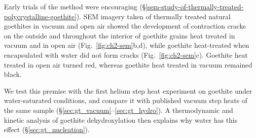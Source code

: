 Early trials of the method were encouraging (\S\ref{sem-study-of-thermally-treated-polycrystalline-goethite}).
SEM imagery taken of thermally treated natural goethites in vacuum and
open air showed the development of contraction cracks on the outside and
throughout the interior of goethite grains heat treated in vacuum and in
open air (Fig.~\ref{fig:ch2-sem}b,d), while goethite heat-treated when
encapsulated with water did not form cracks (Fig.~\ref{fig:ch2-sem}c).
Goethite heat treated in open air turned red, whereas goethite heat
treated in vacuum remained black.

We test this premise with the first helium step heat experiment on goethite under
water-saturated conditions, and compare it with published vacuum step heats of the same sample
(\S\ref{sec:gt_vacuum}--\ref{sec:gt_hydro}). A thermodynamic and kinetic analysis of goethite
dehydroxylation then explains why water has this effect
(\S\ref{sec:gt_nucleation}).

